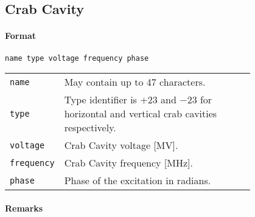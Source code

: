 


\subsection{Crab Cavity} \label{CrabCav}

\paragraph{Format} \texttt{name type voltage frequency phase}

\bigskip
\begin{tabular}{@{}lp{0.8\linewidth}}
    \texttt{name} & May contain up to 47 characters. \\
    \texttt{type} & Type identifier is $+23$ and $-23$ for horizontal and vertical crab cavities respectively. \\
    \texttt{voltage} & Crab Cavity voltage [MV]. \\
    \texttt{frequency} & Crab Cavity frequency [MHz]. \\
    \texttt{phase} & Phase of the excitation in radians.
\end{tabular}

\paragraph{Remarks}~\\

